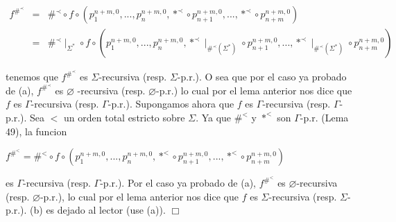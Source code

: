 \(\displaystyle \begin{array}{rcl} f^{\#^{\prec }} & =& \#^{\prec }\circ f\circ \left( p_{1}^{n+m,0},...,p_{n}^{n+m,0},\ast ^{\prec }\circ p_{n+1}^{n+m,0},...,\ast ^{\prec }\circ p_{n+m}^{n+m,0}\right) \\ & =& \#^{\prec }\mid _{\Sigma ^{\ast }}\circ f\circ \left( p_{1}^{n+m,0},...,p_{n}^{n+m,0},\ast ^{\prec }\mid _{\#^{\prec }(\Sigma ^{\ast })}\circ p_{n+1}^{n+m,0},...,\ast ^{\prec }\mid _{\#^{\prec }(\Sigma ^{\ast })}\circ p_{n+m}^{n+m,0}\right) \end{array} \)

tenemos que \(f^{\#^{\prec }}\) es \(\Sigma \)-recursiva (resp. \(\Sigma \)-p.r.). O sea que por el caso ya probado de (a), \(f^{\#^{\prec }}\) es \(\varnothing \) -recursiva (resp. \(\varnothing \)-p.r.) lo cual por el lema anterior nos dice que \(f\) es \(\Gamma \)-recursiva (resp. \(\Gamma \)-p.r.).
Supongamos ahora que \(f\) es \(\Gamma \)-recursiva (resp. \(\Gamma \)-p.r.). Sea \( < \) un orden total estricto sobre \(\Sigma .\) Ya que \(\#^{< }\) y \(\ast ^{< }\) son \(\Gamma \)-p.r. (Lema 49), la funcion

\(\displaystyle f^{\#^{< }}=\#^{< }\circ f\circ \left( p_{1}^{n+m,0},...,p_{n}^{n+m,0},\ast ^{< }\circ p_{n+1}^{n+m,0},...,\ast ^{< }\circ p_{n+m}^{n+m,0}\right) \)

es \(\Gamma \)-recursiva (resp. \(\Gamma \)-p.r.). Por el caso ya probado de (a), \(f^{\#^{< }}\) es \(\varnothing \)-recursiva (resp. \(\varnothing \)-p.r.), lo cual por el lema anterior nos dice que \(f\) es \(\Sigma \)-recursiva (resp. \( \Sigma \)-p.r.).
(b) es dejado al lector (use (a)). \(\Box\)
